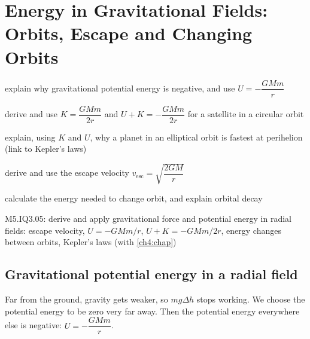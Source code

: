 \chapter[Energy in Gravitational Fields]{Energy in Gravitational Fields: Orbits, Escape and Changing Orbits}\label{ch5:chap}


\begin{goals}
  \item explain why gravitational potential energy is negative, and use
        $U = -\dfrac{GMm}{r}$
  \item derive and use $K = \dfrac{GMm}{2r}$ and $U + K = -\dfrac{GMm}{2r}$ for a
        satellite in a circular orbit
  \item explain, using $K$ and $U$, why a planet in an elliptical orbit is
        fastest at perihelion (link to Kepler's laws)
  \item derive and use the escape velocity $v_\mathrm{esc} = \sqrt{\dfrac{2GM}{r}}$
  \item calculate the energy needed to change orbit, and explain orbital decay
\end{goals}

\begin{syllabus}
  \item M5.IQ3.05: derive and apply gravitational force and potential energy in
        radial fields: escape velocity, $U = -GMm/r$, $U + K = -GMm/2r$, energy
        changes between orbits, Kepler's laws (with \cref{ch4:chap})
\end{syllabus}

\section{Gravitational potential energy in a radial field}\label{ch5:sec:gpe}

\begin{bigidea}
Far from the ground, gravity gets weaker, so $mg\Delta h$ stops working. We
choose the potential energy to be zero very far away. Then the potential energy
everywhere else is negative: $U = -\dfrac{GMm}{r}$.
\end{bigidea}

